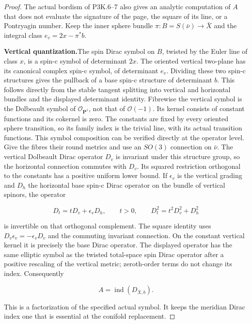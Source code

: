 \begin{proof}
The actual bordism of P3K.6–7 also gives an analytic computation of
\(A\) that does not evaluate the signature of the page, the square
of its line, or a Pontryagin number.  Keep the inner sphere bundle
\(\pi:B=S(\bar\nu)\to\bar X\) and the integral class
\(e_v=2x-\pi^*b\).

\par\medskip\noindent\textbf{Vertical quantization.}\enspace The spin Dirac symbol on \(B\),
twisted by the Euler line of class \(x\), is a spin-c symbol of
determinant \(2x\).  The oriented vertical two-plane has its
canonical complex spin-c symbol, of determinant \(e_v\).  Dividing
these two spin-c structures gives the pullback of a base spin-c
structure of determinant \(b\).  This follows directly from the
stable tangent splitting into vertical and horizontal bundles and
the displayed determinant identity.  Fibrewise the vertical symbol
is the Dolbeault symbol of \(\mathcal O_{\mathbf P^1}\), not that of
\(\mathcal O(-1)\).  Its kernel consists of constant functions and
its cokernel is zero.  The constants are fixed by every oriented
sphere transition, so its family index is the trivial line, with
its actual transition functions.  This symbol composition can be
verified directly at the operator level.  Give the fibres their
round metrics and use an \(SO(3)\) connection on \(\bar\nu\).
The vertical Dolbeault Dirac operator \(D_v\) is invariant under
this structure group, so the horizontal connection commutes with
\(D_v\).  Its squared restriction orthogonal to the constants
has a positive uniform lower bound.  If \(\epsilon_v\) is the
vertical grading and \(D_h\) the horizontal base spin-c Dirac
operator on the bundle of vertical spinors, the operator

\[
 D_t=tD_v+\epsilon_vD_h,\qquad t>0,
 \qquad D_t^2=t^2D_v^2+D_h^2
\]

is invertible on that orthogonal complement.  The square identity
uses \(D_v\epsilon_v=-\epsilon_vD_v\) and the commuting invariant
connection.  On the constant vertical kernel it is precisely the
base Dirac operator.  The displayed operator has the same elliptic
symbol as the twisted total-space spin Dirac operator after a
positive rescaling of the vertical metric; zeroth-order terms do
not change its index.  Consequently

\[
 A=\operatorname{ind}(D_{\bar X,b}).
\]

This is a factorization of the specified actual symbol.  It keeps
the meridian Dirac index one that is essential at the conifold
replacement.


\end{proof}
